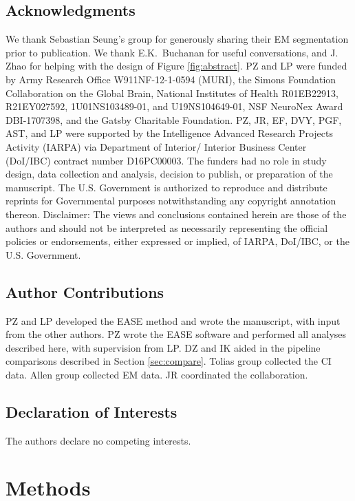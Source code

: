 \documentclass[10pt,letterpaper]{article}
\begin{document}
\subsection*{Acknowledgments}

We thank Sebastian Seung's group for generously sharing their EM segmentation prior to publication.  We thank E.K.\ Buchanan for useful conversations, and J. Zhao for helping with the design of Figure \ref{fig:abstract}. PZ and LP were funded by Army Research Office W911NF-12-1-0594 (MURI), the Simons Foundation Collaboration on the Global Brain, National Institutes of Health R01EB22913, R21EY027592, 1U01NS103489-01, and U19NS104649-01, NSF NeuroNex Award DBI-1707398, and the Gatsby Charitable Foundation.  PZ, JR, EF, DVY, PGF, AST, and LP were supported by the Intelligence Advanced Research Projects Activity (IARPA) via Department of Interior/ Interior Business Center (DoI/IBC) contract number D16PC00003. The funders had no role in study design, data collection and analysis, decision to publish, or preparation of the manuscript.
The U.S. Government is authorized to reproduce and distribute reprints for Governmental purposes notwithstanding any copyright annotation thereon. Disclaimer: The views and conclusions contained herein are those of the authors and should not be interpreted as necessarily representing the official policies or endorsements, either expressed or implied, of IARPA, DoI/IBC, or the U.S. Government. 

\subsection*{Author Contributions}

PZ and LP developed the EASE method and wrote the manuscript, with input from the other authors. PZ wrote the EASE software and performed all analyses described here, with supervision from LP.  DZ and IK aided in the pipeline comparisons described in Section \ref{sec:compare}.  Tolias group collected the CI data.  Allen group collected EM data. JR coordinated the collaboration.  

\subsection*{Declaration of Interests}
The authors declare no competing interests.


\section{Methods}
\end{document}
